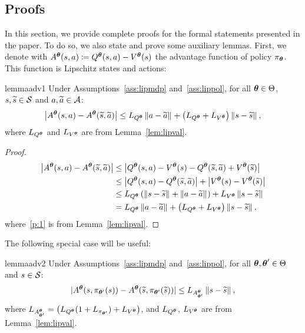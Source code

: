 \subsection{Proofs}
In this section, we provide complete proofs for the formal statements presented in the paper. To do so, we also state and prove some auxiliary lemmas. 
First, we denote with $A^{\boldsymbol{\theta}}(s,a)\coloneqq Q^{\boldsymbol{\theta}}(s,a) - V^{\boldsymbol{\theta}}(s)$ the advantage function of policy $\pi_{\boldsymbol{\theta}}$. This function is Lipschitz \wrt states and actions:
\begin{restatable}{lemma}{adv1}\label{lem:adv1}
	Under Assumptions~\ref{ass:lipmdp} and~\ref{ass:lippol}, for all $\boldsymbol{\theta}\in\Theta$, $s,\widetilde{s}\in\mathcal{S}$ and $a,\widetilde{a}\in\mathcal{A}$:
	\begin{align*}
	\left|A^{\boldsymbol{\theta}}(s,a) - A^{\boldsymbol{\theta}}(\widetilde{s},\widetilde{a})\right| \leq L_{Q^{\boldsymbol{\theta}}}\left\|a-\widetilde{a}\right\|_{} + \left(L_{Q^{\boldsymbol{\theta}}} + L_{V^{\boldsymbol{\theta}}}\right)\left\|s-\widetilde{s}\right\|_{},
	\end{align*}
	where $L_{Q^{\boldsymbol{\theta}}}$ and $L_{V^{\boldsymbol{\theta}}}$ are from Lemma~\ref{lem:lipval}.
\end{restatable}
\begin{proof}
	\begin{align}
	\left|A^{\boldsymbol{\theta}}(s,a) - A^{\boldsymbol{\theta}}(\widetilde{s},\widetilde{a})\right| &\leq \left|Q^{\boldsymbol{\theta}}(s,a) - V^{\boldsymbol{\theta}}(s) - Q^{\boldsymbol{\theta}}(\widetilde{s},\widetilde{a}) + V^{\boldsymbol{\theta}}(\widetilde{s})\right| \nonumber\\
	&\leq \left|Q^{\boldsymbol{\theta}}(s,a) - Q^{\boldsymbol{\theta}}(\widetilde{s},\widetilde{a})\right| + \left|V^{\boldsymbol{\theta}}(s) - V^{\boldsymbol{\theta}}(\widetilde{s})\right| \nonumber\\
	&\leq L_{Q^{\boldsymbol{\theta}}}\left(\left\|s-\widetilde{s}\right\|_{} + \left\|a-\widetilde{a}\right\|_{}\right) + L_{V^{\boldsymbol{\theta}}}\left\|s-\widetilde{s}\right\|_{} \label{p:1}\\
	&=L_{Q^{\boldsymbol{\theta}}}\left\|a-\widetilde{a}\right\|_{} + \left(L_{Q^{\boldsymbol{\theta}}} + L_{V^{\boldsymbol{\theta}}}\right)\left\|s-\widetilde{s}\right\|_{}\nonumber,
	\end{align}
	where~\eqref{p:1} is from Lemma~\ref{lem:lipval}.
\end{proof}
The following special case will be useful:
\begin{restatable}{lemma}{adv2}\label{lem:adv2}
	Under Assumptions~\ref{ass:lipmdp} and~\ref{ass:lippol}, for all $\boldsymbol{\theta},\boldsymbol{\theta}'\in\Theta$ and $s\in\mathcal{S}$:
	\begin{align*}
	|A^{\boldsymbol{\theta}}(s,\pi_{\boldsymbol{\theta}'}(s)) - A^{\boldsymbol{\theta}}(\widetilde{s},\pi_{\boldsymbol{\theta}'}(\widetilde{s}))| \leq L_{A^{\boldsymbol{\theta}}_{\boldsymbol{\theta}'}}\left\|s-\widetilde{s}\right\|_{},
	\end{align*}
	where $L_{A^{\boldsymbol{\theta}}_{\boldsymbol{\theta}'}}=\left(L_{Q^{\boldsymbol{\theta}}}(1 + L_{\pi_{\boldsymbol{\theta}'}}) + L_{V^{\boldsymbol{\theta}}}\right)$, and $L_{Q^{\boldsymbol{\theta}}}$, $L_{V^{\boldsymbol{\theta}}}$ are from Lemma~\ref{lem:lipval}.
\end{restatable}
